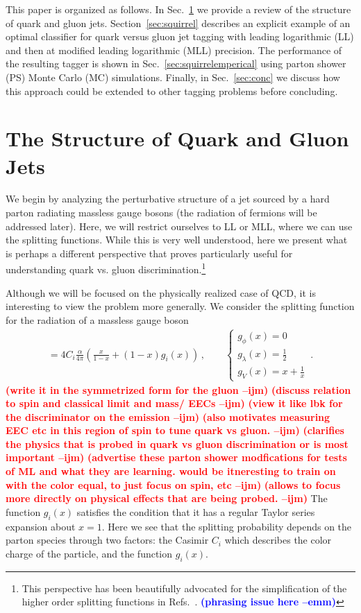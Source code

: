 \documentclass[letterpaper,11pt]{article}
\DeclareRobustCommand{\Sec}[1]{Sec.~\ref{#1}}
\DeclareRobustCommand{\Refs}[1]{Refs.~\cite{#1}}
\newcommand{\ijm}[1]{\marginpar{\raggedright\scriptsize\textbf{\textcolor{red}{ijm}}}  \textbf{\textcolor{red}{(#1 --ijm)}}}
\begin{document}
This paper is organized as follows.
%
In \Sec{sec:structure} we provide a review of the structure of quark and gluon jets.
%
Section~\ref{sec:squirrel} describes an explicit example of an optimal classifier for quark versus gluon jet tagging with leading logarithmic (LL) and then at modified leading logarithmic (MLL) precision.
%
The performance of the resulting tagger is shown in \Sec{sec:squirrelemperical} using parton shower (PS) Monte Carlo (MC) simulations.
%
Finally, in \Sec{sec:conc} we discuss how this approach could be extended to other tagging problems before concluding.




\section{The Structure of Quark and Gluon Jets}
\label{sec:structure}

We begin by analyzing the perturbative structure of a jet sourced by a hard parton radiating massless gauge bosons (the radiation of fermions will be addressed later).
%
Here, we will restrict ourselves to LL or MLL, where we can use the splitting functions.
%
While this is very well understood, here we present what is perhaps a different perspective that proves particularly useful for understanding quark vs. gluon discrimination.\footnote{This perspective has been beautifully advocated for the simplification of the higher order splitting functions in \Refs{Dokshitzer:2005bf,Dokshitzer:2006nm,Beccaria:2007bb}.
{\bf \textcolor{blue}{(phrasing issue here --emm)}}
}



Although we will be focused on the physically realized case of QCD, it is interesting to view the problem more generally. We consider the splitting function for the radiation of a massless gauge boson
\begin{align}\label{eq:split_general}
=4C_i \frac{\alpha}{4\pi} \left(\frac{x}{1-x}+(1-x) g_i(x)   \right)\,, \qquad \left\{ \begin{array}{l}g_\phi(x)=0 \\ g_\lambda(x)=\frac{1}{2} \\g_V(x)=x+\frac{1}{x} \end{array} \right. \,.
\end{align}
\ijm{write it in the symmetrized form for the gluon}\ijm{discuss relation to spin and classical limit and mass/ EECs}\ijm{view it like lbk for the discriminator on the emission}\ijm{also motivates measuring EEC etc in this region of spin to tune quark vs gluon.}\ijm{clarifies the physics that is probed in quark vs gluon discrimination or is most important}\ijm{advertise these parton shower modfications for tests of ML and what they are learning. would be itneresting to train on with the color equal, to just focus on spin, etc}\ijm{allows to focus more directly on physical effects that are being probed.}
The function $g_i(x)$ satisfies the condition that it has a regular Taylor series expansion about $x=1$.
%
Here we see that the splitting probability depends on the parton species through two factors: the Casimir $C_i$ which describes the color charge of the particle, and the function $g_i(x)$.
\end{document}
